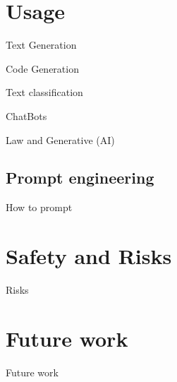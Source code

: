 \documentclass[10pt]{beamer}
\begin{document}
\section{Usage}

\begin{frame}{Text Generation}


\end{frame}

\begin{frame}{Code Generation}


\end{frame}

\begin{frame}{Text classification}


\end{frame}


\begin{frame}{ChatBots}


\end{frame}


\begin{frame}{Law and Generative (AI)}


\end{frame}




\subsection{Prompt engineering}

\begin{frame}{How to prompt}


\end{frame}

\section{Safety and Risks}

\begin{frame}{Risks}


\end{frame}

\section{Future work}
\begin{frame}{Future work}


\end{frame}
\end{document}
